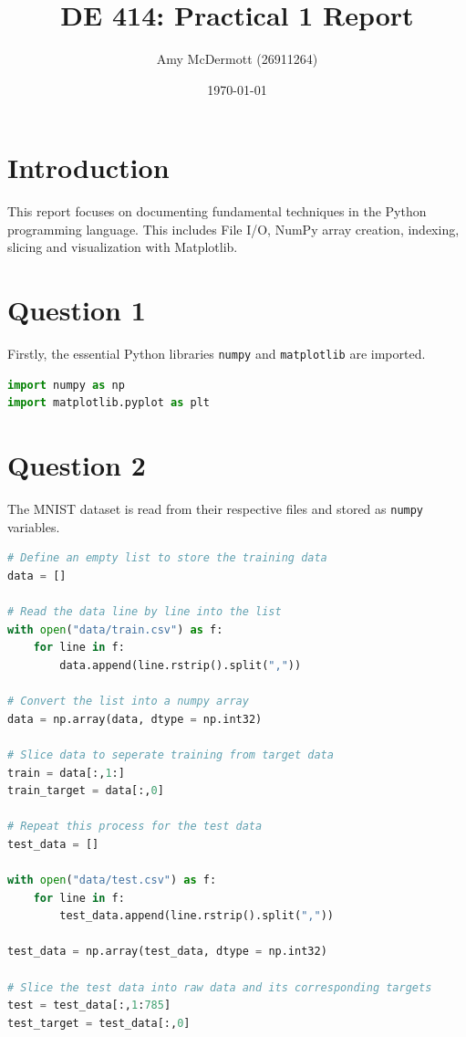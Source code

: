 \documentclass[12pt]{article}
\title{DE 414: Practical 1 Report}
\author{Amy McDermott (26911264)}
\date{\today}
\begin{document}
\maketitle

\section*{Introduction}
This report focuses on documenting fundamental techniques in the Python programming language. This includes File I/O, NumPy array creation, indexing, slicing and visualization with Matplotlib.

\section{Question 1}
Firstly, the essential Python libraries \texttt{numpy} and \texttt{matplotlib} are imported.

\begin{lstlisting}[language=Python, caption={Import libraries}]
import numpy as np
import matplotlib.pyplot as plt
\end{lstlisting}

\section{Question 2}
The MNIST dataset is read from their respective files and stored as \texttt{numpy} variables. 

\begin{lstlisting}[language=Python, caption={Read the MNIST dataset into numpy variables}]
# Define an empty list to store the training data
data = []

# Read the data line by line into the list
with open("data/train.csv") as f:
    for line in f:
        data.append(line.rstrip().split(","))

# Convert the list into a numpy array
data = np.array(data, dtype = np.int32)

# Slice data to seperate training from target data
train = data[:,1:]
train_target = data[:,0]

# Repeat this process for the test data
test_data = []

with open("data/test.csv") as f:
    for line in f:
        test_data.append(line.rstrip().split(","))

test_data = np.array(test_data, dtype = np.int32)

# Slice the test data into raw data and its corresponding targets
test = test_data[:,1:785]
test_target = test_data[:,0]
\end{lstlisting}
\end{document}

